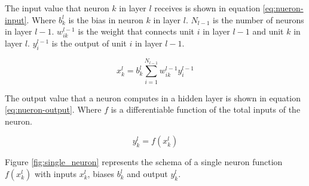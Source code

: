 The input value that neuron $k$ in layer $l$ receives is shown in equation \ref{eq:nueron-input}. Where $b_{k}^{l}$ is the bias in neuron $k$ in layer $l$. $N_{l-1}$ is the number of neurons in layer $l -1$. $w_{ik}^{l-1}$ is the weight that connects unit $i$ in layer $l -1$ and unit $k$ in layer $l$. $y_{i}^{l-1}$ is the output of unit $i$ in layer $l -1$. \cite{Krizhevsky2009LearningImages}

\begin{equation} \label{eq:nueron-input}
	x_{k}^{l}= b_{k}^{l} \sum_{i=1}^{N_{l-1}} w_{ik}^{l-1} y_{i}^{l-1}
\end{equation}

The output value that a neuron computes in a hidden layer is shown in equation \ref{eq:nueron-output}. Where $f$ is a differentiable function of the total inputs of the neuron.

\begin{equation} \label{eq:nueron-output}
	y_{k}^{l} = f(x_{k}^{l})
\end{equation}

Figure \ref{fig:single_neuron} represents the schema of a single neuron function $f(x_{k}^{l})$ with inputs $x_{k}^{l}$, biases $b_{k}^{l}$ and output $y_{k}^{l}$.

